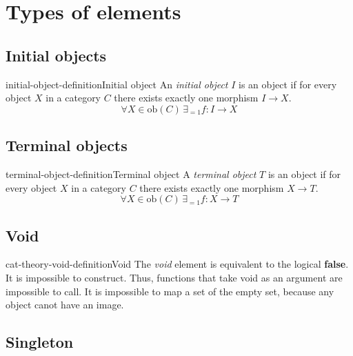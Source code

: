 \documentclass[preview]{standalone}
\begin{document}
\section{Types of elements}

\subsection{Initial objects}

\begin{snippetdefinition}{initial-object-definition}{Initial object}
    An \textit{initial object} \(I\) is an object if
    for every object \(X\) in a category \(C\)
    there exists exactly one morphism \(I\to X\).
    \[
        \forall X\in \text{ob}(C) \,\exists_{=1}f\colon I\to X
    \]
\end{snippetdefinition}

\subsection{Terminal objects}

\begin{snippetdefinition}{terminal-object-definition}{Terminal object}
    A \textit{terminal object} \(T\) is an object if
    for every object \(X\) in a category \(C\)
    there exists exactly one morphism \(X\to T\).
    \[
        \forall X\in \text{ob}(C) \,\exists_{=1}f\colon X\to T
    \]
\end{snippetdefinition}

\subsection{Void}

\begin{snippetdefinition}{cat-theory-void-definition}{Void}
    The \textit{void} element is equivalent to the logical \textbf{false}.
    It is impossible to construct. Thus, functions that take void
    as an argument are impossible to call.
    It is impossible to map a set of the empty set, because
    any object canot have an image.
\end{snippetdefinition}


\subsection{Singleton}
\end{document}
